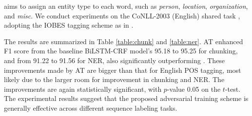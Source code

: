\documentclass[11pt,a4paper]{article}
\begin{document}
\begin{table}[!t]
\setlength{\extrarowheight}{1pt}
\centering
{}\vspace{-1mm}

\caption{NER F1 scores on the CoNLL-2003 (English) task, with other top performing models.}
\label{table:ner}
\vspace{-4mm}
\end{table}

 aims to assign an entity type to each word, such as {\it person}, {\it location}, {\it organization}, and {\it misc}.
We conduct experiments on
the CoNLL-2003 (English) shared task \cite{tjong2003introduction}, adopting the IOBES tagging scheme as in \cite{Lample2016ner,ma-hovy:2016:P16-1}.\vspace{0.5mm}


The results are summarized in Table \ref{table:chunk} and \ref{table:ner}.
AT enhanced F1 score from the baseline BiLSTM-CRF model's 95.18 to 95.25 for chunking, and from 91.22 to 91.56 for NER, also significantly outperforming .
These improvements made by AT are bigger than that for English POS tagging, most likely due to the larger room for improvement in chunking and NER. 
The improvements are again statistically significant, with $p$-value \scalebox{0.9}{$<$} 0.05 on the $t$-test. 
The experimental results suggest that the proposed adversarial training scheme is generally effective across different sequence labeling tasks. 
\end{document}
